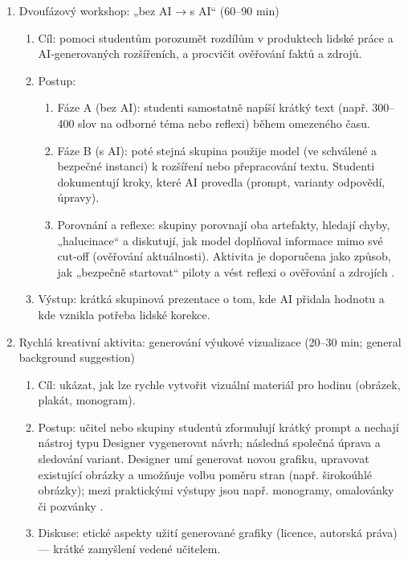 \begin{enumerate}
  \item Dvoufázový workshop: „bez AI → s AI“ (60–90 min)
    \begin{enumerate}
      \item Cíl: pomoci studentům porozumět rozdílům v produktech lidské práce a AI‑generovaných rozšířeních, a procvičit ověřování faktů a zdrojů.
      \item Postup:
        \begin{enumerate}
          \item Fáze A (bez AI): studenti samostatně napíší krátký text (např. 300–400 slov na odborné téma nebo reflexi) během omezeného času.
          \item Fáze B (s AI): poté stejná skupina použije model (ve schválené a bezpečné instanci) k rozšíření nebo přepracování textu. Studenti dokumentují kroky, které AI provedla (prompt, varianty odpovědí, úpravy).
          \item Porovnání a reflexe: skupiny porovnají oba artefakty, hledají chyby, „halucinace“ a diskutují, jak model doplňoval informace mimo své cut‑off (ověřování aktuálnosti). Aktivita je doporučena jako způsob, jak „bezpečně startovat“ piloty a vést reflexi o ověřování a zdrojích \cite{kb_malinka_chatgpt_ve_vyuce_dva_roky_pote_2024_pdf_90bc3aaf_page_12_1,kb_ai_101_tipu_pdf_04e4a115_page_15_2}.
        \end{enumerate}
      \item Výstup: krátká skupinová prezentace o tom, kde AI přidala hodnotu a kde vznikla potřeba lidské korekce.
    \end{enumerate}

  \item Rychlá kreativní aktivita: generování výukové vizualizace (20–30 min; general background suggestion)
    \begin{enumerate}
      \item Cíl: ukázat, jak lze rychle vytvořit vizuální materiál pro hodinu (obrázek, plakát, monogram).
      \item Postup: učitel nebo skupiny studentů zformulují krátký prompt a nechají nástroj typu Designer vygenerovat návrh; následná společná úprava a sledování variant. Designer umí generovat novou grafiku, upravovat existující obrázky a umožňuje volbu poměru stran (např. širokoúhlé obrázky); mezi praktickými výstupy jsou např. monogramy, omalovánky či pozvánky \cite{kb_ai_101_tipu_pdf_04e4a115_page_51_1}.
      \item Diskuse: etické aspekty užití generované grafiky (licence, autorská práva) — krátké zamyšlení vedené učitelem.
    \end{enumerate}


\end{enumerate}
